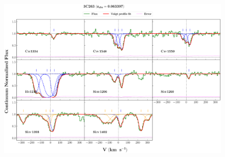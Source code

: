 \documentclass[12pt,draft]{report}
\begin{document}
\begin{landscape}

\begin{figure}
    \centering
    \vspace{-20mm}
    \hspace*{-35mm}
    \includegraphics[width=1.25\linewidth]{System-Plots/3C263_z=0.063397_sys_plot.png}
\end{figure}

\end{landscape}
\end{document}
